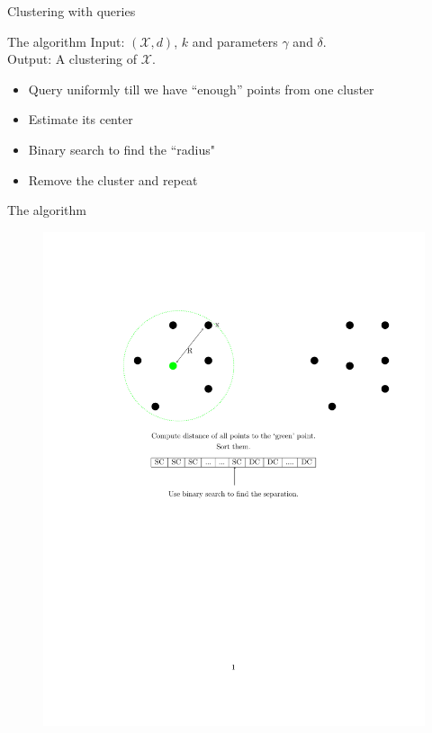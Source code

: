 \documentclass{beamer}
\newcommand{\mc}{\mathcal}
\begin{document}
\begin{frame}{Clustering with queries}
  \begin{block}{The algorithm}
	\vspace{0.2cm}Input: $(\mc X, d)$, $k$ and parameters $\gamma$ and $\delta$.\\
    \vspace{0.2cm}Output: A clustering of $\mc X$.\\
	\vspace{0.3cm}
	\begin{itemize}
	  \item Query uniformly till we have ``enough'' points from one cluster
      \vspace{0.2cm}
	  \item Estimate its center
      \vspace{0.2cm}
	  \item Binary search to find the ``radius"
      \vspace{0.2cm}
	  \item Remove the cluster and repeat
    \end{itemize}  
  \end{block}
\end{frame}

\begin{frame}{The algorithm}   
   \begin{figure}
	  \includegraphics[trim = 100 0 0 120, clip, width=\linewidth]{figures/gammaAlgo.pdf}
   \end{figure}
\end{frame}
\end{document}
